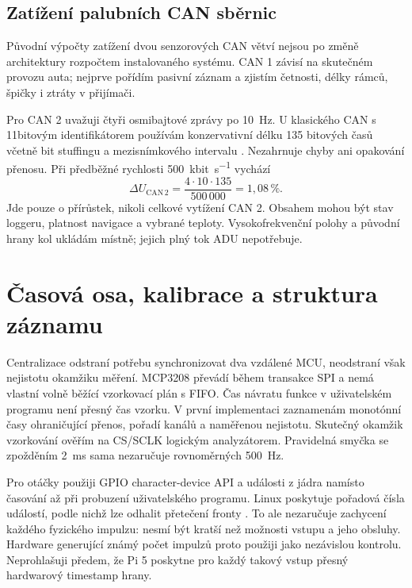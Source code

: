 \subsection{Zatížení palubních CAN sběrnic}

Původní výpočty zatížení dvou senzorových CAN větví nejsou po změně
architektury rozpočtem instalovaného systému. CAN 1 závisí na skutečném
provozu auta; nejprve pořídím pasivní záznam a zjistím četnosti,
délky rámců, špičky i ztráty v přijímači.

Pro CAN 2 uvažuji čtyři osmibajtové zprávy po \SI{10}{Hz}. U klasického
CAN s 11bitovým identifikátorem používám konzervativní délku
135 bitových časů včetně bit stuffingu a mezisnímkového intervalu
\cite{bosch-can-integrace}. Nezahrnuje chyby ani opakování přenosu.
Při předběžné rychlosti \SI{500}{kbit\per\second} vychází
\begin{equation}
 \Delta U_{\mathrm{CAN\,2}}=
 \frac{4\cdot10\cdot135}{500\,000}=1{,}08\,\%.
\end{equation}
Jde pouze o přírůstek, nikoli celkové vytížení CAN 2. Obsahem mohou
být stav loggeru, platnost navigace a vybrané teploty. Vysokofrekvenční
polohy a původní hrany kol ukládám místně; jejich plný tok ADU nepotřebuje.

\section{Časová osa, kalibrace a struktura záznamu}

Centralizace odstraní potřebu synchronizovat dva vzdálené MCU,
neodstraní však nejistotu okamžiku měření. MCP3208 převádí během
transakce SPI a nemá vlastní volně běžící vzorkovací plán s FIFO.
Čas návratu funkce v uživatelském programu není přesný čas vzorku.
V první implementaci zaznamenám monotónní časy ohraničující přenos,
pořadí kanálů a naměřenou nejistotu. Skutečný okamžik vzorkování
ověřím na CS/SCLK logickým analyzátorem. Pravidelná smyčka se zpožděním
\SI{2}{ms} sama nezaručuje rovnoměrných \SI{500}{Hz}.

Pro otáčky použiji GPIO character-device API a události z jádra
namísto časování až při probuzení uživatelského programu. Linux
poskytuje pořadová čísla událostí, podle nichž lze odhalit přetečení
fronty \cite{linux-gpio-adc}. To ale nezaručuje zachycení každého
fyzického impulzu: nesmí být kratší než možnosti vstupu a jeho
obsluhy. Hardware generující známý počet impulzů proto použiji jako
nezávislou kontrolu. Neprohlašuji předem, že Pi 5 poskytne pro každý
takový vstup přesný hardwarový timestamp hrany.

